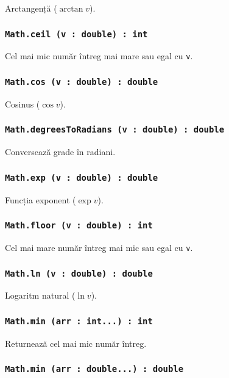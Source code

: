 Arctangență ($\arctan{v}$).

\subsubsection{\texttt{Math.ceil (v : double) : int}}

Cel mai mic număr întreg mai mare sau egal cu \texttt{v}.

\subsubsection{\texttt{Math.cos (v : double) : double}}

Cosinus ($\cos{v}$).

\subsubsection{\texttt{Math.degreesToRadians (v : double) : double}}

Conversează grade în radiani.

\subsubsection{\texttt{Math.exp (v : double) : double}}

Funcția exponent ($\exp{v}$).

\subsubsection{\texttt{Math.floor (v : double) : int}}

Cel mai mare număr întreg mai mic sau egal cu \texttt{v}.

\subsubsection{\texttt{Math.ln (v : double) : double}}

Logaritm natural ($\ln{v}$).

\subsubsection{\texttt{Math.min (arr : int...) : int}}

Returnează cel mai mic număr întreg.

\subsubsection{\texttt{Math.min (arr : double...) : double}}

